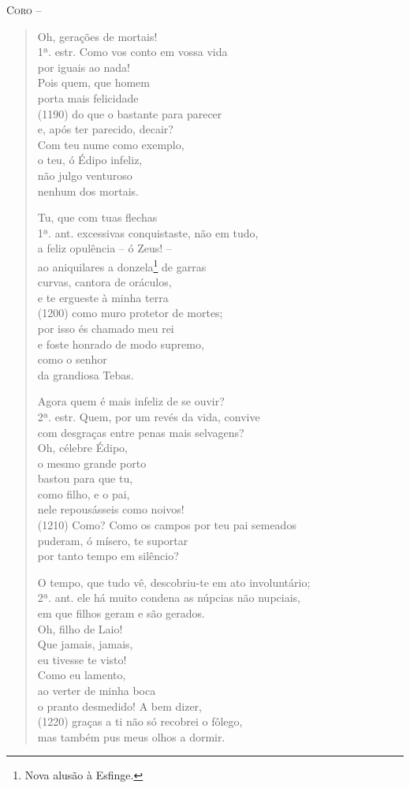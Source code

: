 \textsc{Coro} -- \begin{verse}Oh, gerações de mortais!\\ 1ª. estr.
Como vos conto em vossa vida\\
por iguais ao nada!\\
Pois quem, que homem\\
porta mais felicidade\\ (1190)
do que o bastante para parecer\\
e, após ter parecido, decair?\\
Com teu nume como exemplo,\\
o teu, ó Édipo infeliz,\\
não julgo venturoso\\
nenhum dos mortais.

Tu, que com tuas flechas\\ 1ª. ant.
excessivas conquistaste, não em tudo,\\
a feliz opulência -- ó Zeus! --\\
ao aniquilares a donzela\footnote{Nova alusão à Esfinge.} de garras\\
curvas, cantora de oráculos,\\
e te ergueste à minha terra\\ (1200)
como muro protetor de mortes;\\
por isso és chamado meu rei\\
e foste honrado de modo supremo,\\
como o senhor\\
da grandiosa Tebas.

Agora quem é mais infeliz de se ouvir?\\ 2ª. estr.
Quem, por um revés da vida, convive\\
com desgraças entre penas mais selvagens?\\
Oh, célebre Édipo,\\
o mesmo grande porto\\
bastou para que tu,\\
como filho, e o pai,\\
nele repousásseis como noivos!\\ (1210)
Como? Como os campos por teu pai semeados\\
puderam, ó mísero, te suportar\\
por tanto tempo em silêncio?

O tempo, que tudo vê, descobriu-te em ato involuntário;\\ 2ª. ant.
ele há muito condena as núpcias não nupciais,\\
em que filhos geram e são gerados.\\
Oh, filho de Laio!\\
Que jamais, jamais,\\
eu tivesse te visto!\\
Como eu lamento,\\
ao verter de minha boca\\
o pranto desmedido! A bem dizer,\\ (1220)
graças a ti não só recobrei o fôlego,\\
mas também pus meus olhos a dormir.
\end{verse}


